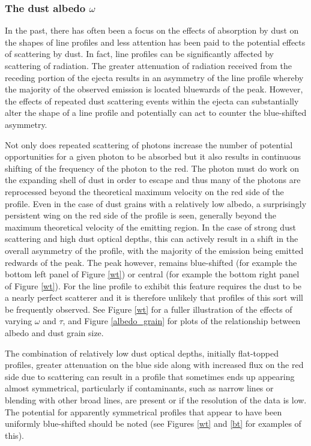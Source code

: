 \documentclass[useAMS,usenatbib,usegraphicx]{mnras}
\begin{document}
\subsubsection{The dust albedo $\omega$}
\label{omega}



In the past, there has often been a focus on the effects of absorption by dust 
on the shapes of line profiles and less attention has been paid to the 
potential effects of scattering by dust.  In fact, line profiles 
can be significantly affected by scattering of radiation.  
The greater attenuation of radiation received from the receding portion of 
the ejecta results in an asymmetry of the line profile whereby the 
majority of the observed emission is located bluewards of the peak.  
However, the effects of repeated dust scattering events within the 
ejecta can substantially alter the shape of a line profile and potentially can act to counter the blue-shifted asymmetry.  

Not only does 
repeated scattering of photons increase the number of potential 
opportunities for a given photon to be absorbed but it also results in 
continuous shifting of the frequency of the photon to the red.  The photon 
must do work on the expanding shell of dust in order to escape and thus 
many of the photons are reprocessed beyond the theoretical maximum 
velocity on the red side of the profile.  Even in the case of dust grains 
with a relatively low albedo, a surprisingly persistent wing on the red 
side of the profile is seen, generally beyond the maximum theoretical velocity 
of the emitting region. In the case of strong 
dust scattering and high dust optical depths, this can actively result in a 
shift in the overall asymmetry of the profile, with the majority of the 
emission being emitted redwards of the peak.
The peak however, remains blue-shifted (for example the bottom left panel of Figure \ref{wt}) or central (for example the bottom right panel of Figure \ref{wt}).  
For the line profile to exhibit this feature requires the dust to be a 
nearly perfect scatterer and it is therefore unlikely that profiles of this sort will be
frequently observed.  See Figure \ref{wt} for a fuller illustration of the effects of varying
$\omega$ and $\tau$, and Figure \ref{albedo_grain} for plots of the relationship between albedo and dust grain size.

The combination of relatively low dust optical depths, initially flat-topped 
profiles, greater attenuation on the blue side along with increased flux on the 
red side due to scattering can result in a profile that sometimes  ends up appearing 
almost symmetrical, particularly if 
contaminants, such as narrow lines or blending with other broad lines, are 
present or if the resolution of the data is low.  The potential for apparently 
symmetrical profiles that appear to have been uniformly blue-shifted 
should be noted (see Figures \ref{wt} and \ref{bt}  for examples of this).
\end{document}

